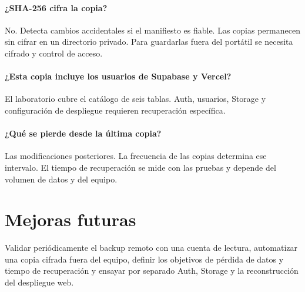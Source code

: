 \documentclass[11pt,a4paper]{article}
\begin{document}
\paragraph{¿SHA-256 cifra la copia?}
No. Detecta cambios accidentales si el manifiesto es fiable. Las copias permanecen sin cifrar en un directorio privado. Para guardarlas fuera del portátil se necesita cifrado y control de acceso.
\paragraph{¿Esta copia incluye los usuarios de Supabase y Vercel?}
El laboratorio cubre el catálogo de seis tablas. Auth, usuarios, Storage y configuración de despliegue requieren recuperación específica.
\paragraph{¿Qué se pierde desde la última copia?}
Las modificaciones posteriores. La frecuencia de las copias determina ese intervalo. El tiempo de recuperación se mide con las pruebas y depende del volumen de datos y del equipo.

\section{Mejoras futuras}
Validar periódicamente el backup remoto con una cuenta de lectura, automatizar una copia cifrada fuera del equipo, definir los objetivos de pérdida de datos y tiempo de recuperación y ensayar por separado Auth, Storage y la reconstrucción del despliegue web.
\end{document}
